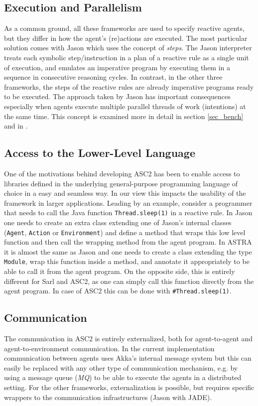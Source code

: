 \subsection{Execution and Parallelism}
\label{subsec:par}
As a common ground, all these frameworks are used to specify reactive agents, but they differ in how the agent's (re)actions are executed. The most particular solution comes with Jason which uses the concept of \textit{steps}. The Jason interpreter treats each symbolic step/instruction in a plan of a reactive rule as a single unit of execution, and emulates an imperative program by executing them in a sequence in consecutive reasoning cycles. In contrast, in the other three frameworks, the steps of the reactive rules are already imperative programs ready to be executed. The approach taken by Jason has important consequences especially when agents execute multiple parallel threads of work (intentions) at the same time. This concept is examined more in detail in section \ref{sec_bench} and in \cite{Astra}.

\subsection{Access to the Lower-Level Language}
One of the motivations behind developing ASC2 has been to enable access to libraries defined in the underlying general-purpose programming language of choice in a easy and seamless way. In our view this impacts the usability of the framework in larger applications. Leading by an example, consider a programmer that needs to call the Java function \verb+Thread.sleep(1)+ in a reactive rule. In Jason one needs to create an extra class extending one of Jason's internal classes (\verb+Agent+, \verb+Action+ or \verb+Environment+) and define a method that wraps this low level function and then call the wrapping method from the agent program. In ASTRA it is almost the same as Jason and one needs to create a class extending the type \verb+Module+, wrap this function inside a method, and annotate it appropriately to be able to call it from the agent program. On the opposite side, this is entirely different for Sarl and ASC2, as one can simply call this function directly from the agent program. In case of ASC2 this can be done with \verb+#Thread.sleep(1)+.

\subsection{Communication}
The communication in ASC2 is entirely externalized, both for agent-to-agent and agent-to-environment communication. In the current implementation communication between agents uses Akka's internal message system but this can easily be replaced with any other type of communication mechanism, e.g. by using a message queue (\textit{MQ}) to be able to execute the agents in a distributed setting. For the other frameworks, externalization is possible, but requires specific wrappers to the communication infrastructures (Jason with JADE).

